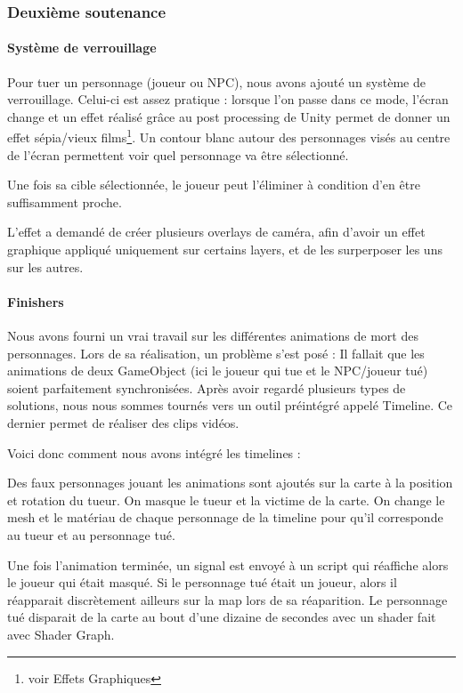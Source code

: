 	\subsubsection{Deuxième soutenance}

		\paragraph{Système de verrouillage}

			Pour tuer un personnage (joueur ou NPC),
			nous avons ajouté un système de verrouillage. Celui-ci est assez pratique : lorsque l'on passe dans ce mode, l'écran change et 
			un effet réalisé grâce au post processing de Unity permet de donner un effet sépia/vieux films\footnote{voir Effets Graphiques}.
			Un contour blanc autour des personnages visés au centre de l'écran permettent voir quel personnage va être sélectionné.

			Une fois sa cible sélectionnée, le joueur peut l'éliminer à condition d'en être suffisamment proche.

			L'effet a demandé de créer plusieurs overlays de caméra, afin d'avoir un effet graphique
			appliqué uniquement sur certains layers, et de les surperposer les uns sur les autres. 

		\paragraph{Finishers}
			Nous avons fourni un vrai travail sur les différentes animations de mort des personnages.
			Lors de sa réalisation, un problème s'est posé : Il fallait que les animations de deux GameObject (ici le joueur qui tue et le NPC/joueur tué) 
			soient parfaitement synchronisées. Après avoir regardé plusieurs types de solutions, nous nous sommes tournés vers un outil préintégré appelé Timeline.
			Ce dernier permet de réaliser des clips vidéos.

			Voici donc comment nous avons intégré les timelines :
			
			Des faux personnages jouant les animations sont ajoutés sur la carte à la position et rotation du tueur.
			On masque le tueur et la victime de la carte.
			On change le mesh et le matériau de chaque personnage de la timeline pour qu'il corresponde au tueur et au
			personnage tué.

			Une fois l'animation terminée, un signal est envoyé à un script qui réaffiche alors le joueur qui était masqué.
			Si le personnage tué était un joueur, alors il réapparait discrètement ailleurs sur la map lors de sa réaparition.
			Le personnage tué disparait de la carte au bout d'une dizaine de secondes avec un shader fait avec Shader Graph.

